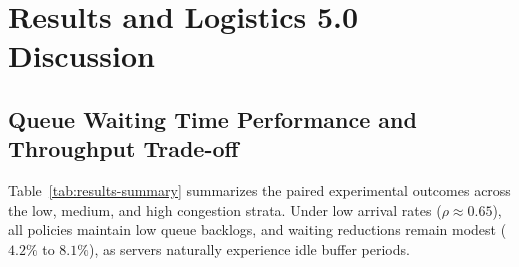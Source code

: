 \documentclass[11pt,a4paper]{article}
\begin{document}
\section{Results and Logistics 5.0 Discussion}
\label{sec:results}

\subsection{Queue Waiting Time Performance and Throughput Trade-off}
Table~\ref{tab:results-summary} summarizes the paired experimental outcomes across the low, medium, and high congestion strata. Under low arrival rates ($\rho \approx 0.65$), all policies maintain low queue backlogs, and waiting reductions remain modest ($4.2\%$ to $8.1\%$), as servers naturally experience idle buffer periods.
\end{document}
